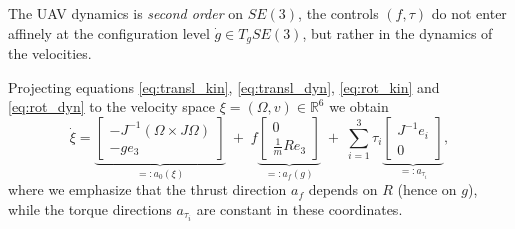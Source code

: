 \documentclass[letterpaper, 10 pt, conference]{ieeeconf}
\newcommand{\R}{\mathbb{R}}
\begin{document}
The UAV dynamics is \emph{second order} on $SE(3)$, the controls $(f,\tau)$ do not enter affinely at the configuration level $\dot g\in T_gSE(3)$, but rather in the dynamics of the velocities.


Projecting equations \eqref{eq:transl_kin}, \eqref{eq:transl_dyn}, \eqref{eq:rot_kin} and \eqref{eq:rot_dyn} to the velocity space $\xi=(\Omega, v)\in \R^{6}$ we obtain
\begin{equation}\label{eq:xi_affine}
\dot\xi = \underbrace{\begin{bmatrix} -J^{-1}(\Omega\times J\Omega)  \\[0.5mm]-g e_3\end{bmatrix}}_{=:a_0(\xi)}
\;+\;
f\underbrace{\begin{bmatrix}0  \\[0.5mm] \frac{1}{m}R e_3\end{bmatrix}}_{=:a_f(g)}
\;+\;
\sum_{i=1}^3 \tau_i\underbrace{\begin{bmatrix} J^{-1}e_i \\[0.5mm]0\end{bmatrix}}_{=:a_{\tau_i}},
\end{equation}
where we emphasize that the thrust direction $a_f$ depends on $R$ (hence on $g$), while the torque directions
$a_{\tau_i}$ are constant in these coordinates.
\end{document}

